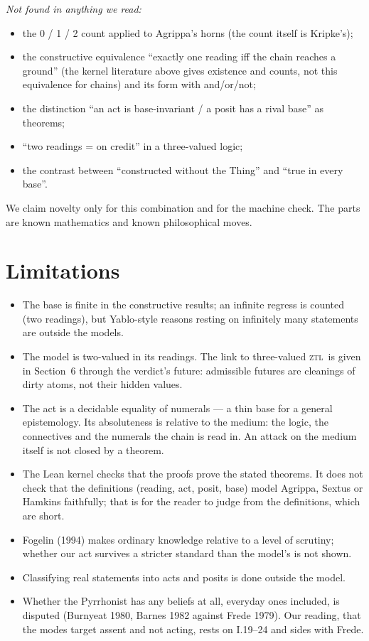 \documentclass[11pt,a4paper]{article}
\newcommand{\ZTL}{\textsc{ztl}}
\begin{document}
\emph{Not found in anything we read:}
\begin{itemize}
\item the 0 / 1 / 2 count applied to Agrippa's horns (the count itself is Kripke's);
\item the constructive equivalence ``exactly one reading iff the chain reaches a ground'' (the kernel literature
  above gives existence and counts, not this equivalence for chains) and its form with and/or/not;
\item the distinction ``an act is base-invariant / a posit has a rival base'' as theorems;
\item ``two readings = on credit'' in a three-valued logic;
\item the contrast between ``constructed without the Thing'' and ``true in every base''.
\end{itemize}
We claim novelty only for this combination and for the machine check. The parts are known mathematics and known
philosophical moves.

\section{Limitations}

\begin{itemize}
\item The base is finite in the constructive results; an infinite regress is counted (two readings), but Yablo-style
  reasons resting on infinitely many statements are outside the models.
\item The model is two-valued in its readings. The link to three-valued \ZTL\ is given in Section~6 through the
  verdict's future: admissible futures are cleanings of dirty atoms, not their hidden values.
\item The act is a decidable equality of numerals --- a thin base for a general epistemology. Its absoluteness is
  relative to the medium: the logic, the connectives and the numerals the chain is read in. An attack on the medium
  itself is not closed by a theorem.
\item The Lean kernel checks that the proofs prove the stated theorems. It does not check that the definitions
  (reading, act, posit, base) model Agrippa, Sextus or Hamkins faithfully; that is for the reader to judge from the
  definitions, which are short.
\item Fogelin (1994) makes ordinary knowledge relative to a level of scrutiny; whether our act survives a stricter
  standard than the model's is not shown.
\item Classifying real statements into acts and posits is done outside the model.
\item Whether the Pyrrhonist has any beliefs at all, everyday ones included, is disputed (Burnyeat 1980, Barnes
  1982 against Frede 1979). Our reading, that the modes target assent and not acting, rests on I.19--24 and sides with
  Frede.
\end{itemize}
\end{document}
